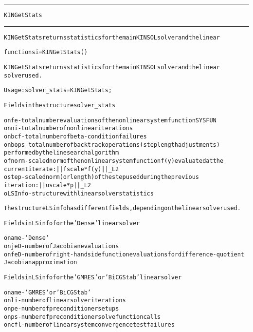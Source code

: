 \begin{samepage}
\hrule
\begin{center}
{\large \verb!KINGetStats!}
\label{p:KINGetStats}
\end{center}
\hrule\vspace{0.1in}



\begin{alltt}
KINGetStats returns statistics for the main KINSOL solver and the linear
\end{alltt}

\end{samepage}



\begin{samepage}


\begin{alltt}
function si = KINGetStats() 
\end{alltt}

\end{samepage}



\begin{alltt}
KINGetStats returns statistics for the main KINSOL solver and the linear
solver used.

   Usage: solver_stats = KINGetStats;

Fields in the structure solver_stats

o nfe    - total number evaluations of the nonlinear system function SYSFUN
o nni    - total number of nonlinear iterations
o nbcf   - total number of beta-condition failures
o nbops  - total number of backtrack operations (step length adjustments) 
           performed by the line search algorithm 
o fnorm  - scaled norm of the nonlinear system function f(y) evaluated at the
           current iterate: ||fscale*f(y)||_L2
o step   - scaled norm (or length) of the step used during the previous 
           iteration: ||uscale*p||_L2
o LSInfo - structure with linear solver statistics

The structure LSinfo has different fields, depending on the linear solver used.

  Fields in LSinfo for the 'Dense' linear solver

o name - 'Dense'
o njeD - number of Jacobian evaluations
o nfeD - number of right-hand side function evaluations for difference-quotient
         Jacobian approximation

  Fields in LSinfo for the 'GMRES' or 'BiCGStab' linear solver

o name - 'GMRES' or 'BiCGStab'
o nli  - number of linear solver iterations
o npe  - number of preconditioner setups
o nps  - number of preconditioner solve function calls
o ncfl - number of linear system convergence test failures
\end{alltt}






\vspace{0.1in}